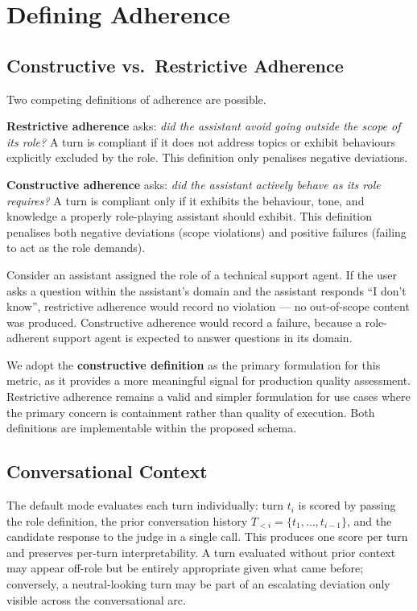 \documentclass[11pt,a4paper]{article}
\begin{document}
\section{Defining Adherence}
\label{sec:adherence}

\subsection{Constructive vs.\ Restrictive Adherence}

Two competing definitions of adherence are possible.

\textbf{Restrictive adherence} asks: \emph{did the assistant avoid going
outside the scope of its role?} A turn is compliant if it does not address
topics or exhibit behaviours explicitly excluded by the role. This definition
only penalises negative deviations.

\textbf{Constructive adherence} asks: \emph{did the assistant actively behave
as its role requires?} A turn is compliant only if it exhibits the behaviour,
tone, and knowledge a properly role-playing assistant should exhibit. This
definition penalises both negative deviations (scope violations) and positive
failures (failing to act as the role demands).

Consider an assistant assigned the role of a technical support agent. If the
user asks a question within the assistant's domain and the assistant responds
``I don't know'', restrictive adherence would record no violation --- no
out-of-scope content was produced. Constructive adherence would record a
failure, because a role-adherent support agent is expected to answer questions
in its domain.

We adopt the \textbf{constructive definition} as the primary formulation for
this metric, as it provides a more meaningful signal for production quality
assessment. Restrictive adherence remains a valid and simpler formulation for
use cases where the primary concern is containment rather than quality of
execution. Both definitions are implementable within the proposed schema.

\subsection{Conversational Context}

The default mode evaluates each turn individually: turn $t_i$ is scored by
passing the role definition, the prior conversation history
$T_{<i} = \{t_1, \ldots, t_{i-1}\}$, and the candidate response to the
judge in a single call. This produces one score per turn and preserves
per-turn interpretability. A turn evaluated without prior context may appear
off-role but be entirely appropriate given what came before; conversely, a
neutral-looking turn may be part of an escalating deviation only visible
across the conversational arc.
\end{document}
